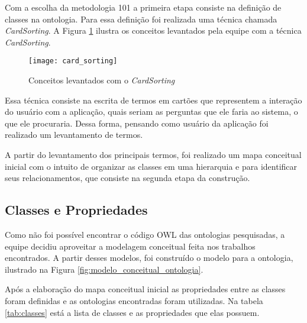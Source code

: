       Com a escolha da metodologia 101 a primeira etapa consiste na definição de classes na ontologia.
      Para essa definição foi realizada uma técnica chamada \textit{CardSorting}. A Figura \ref{fig:card_sorting} 
      ilustra os conceitos levantados pela equipe com a técnica \textit{CardSorting}.
      
      \begin{figure}[!htb]
	\centering
	\texttt{[image: card\_sorting]}
	\caption[Conceitos levantados com o \textit{CardSorting}]{Conceitos levantados com o \textit{CardSorting}}
	\label{fig:card_sorting}
      \end{figure}
      
      Essa técnica consiste na escrita de termos em cartões que representem a interação do usuário com a aplicação,
      quais seriam as perguntas que ele faria ao sistema, o que ele procuraria. Dessa forma, pensando como usuário
      da aplicação foi realizado um levantamento de termos.

      A partir do levantamento dos principais termos, foi realizado um mapa conceitual inicial com o intuito
      de organizar as classes em uma hierarquia e para identificar seus relacionamentos, que consiste na segunda
      etapa da construção.

      \subsection{Classes e Propriedades}
      
	  Como não foi possível encontrar o código OWL das ontologias pesquisadas, a equipe decidiu aproveitar a
	  modelagem conceitual feita nos trabalhos encontrados. A partir desses modelos, foi construído o modelo 
	  para a ontologia, ilustrado na Figura \ref{fig:modelo_conceitual_ontologia}.
	  
	  Após a elaboração do mapa conceitual inicial as propriedades entre as classes foram definidas e as ontologias
	  encontradas foram utilizadas. 
	  Na tabela \ref{tab:classes} está a lista de classes e as propriedades que elas possuem.      

